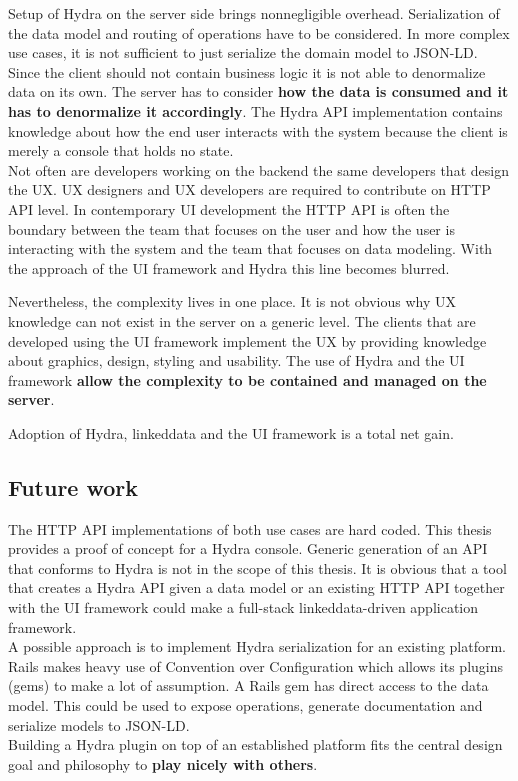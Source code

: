 Setup of Hydra on the server side brings nonnegligible overhead. Serialization of the data model and routing of operations have to be considered. In more complex use cases, it is not sufficient to just serialize the domain model to JSON-LD. Since the client should not contain business logic it is not able to denormalize data on its own. The server has to consider \textbf{how the data is consumed and it has to denormalize it accordingly}. The Hydra API implementation contains knowledge about how the end user interacts with the system because the client is merely a \gls{console} that holds no state. \\
Not often are developers working on the \gls{backend} the same developers that design the UX. UX designers and UX developers are required to contribute on HTTP API level. In contemporary UI development the HTTP API is often the boundary between the team that focuses on the user and how the user is interacting with the system and the team that focuses on data modeling. With the approach of the UI framework and Hydra this line becomes blurred.

Nevertheless, the complexity lives in one place. It is not obvious why UX knowledge can not exist in the server on a generic level. The clients that are developed using the UI framework implement the UX by providing knowledge about graphics, design, styling and usability. The use of Hydra and the UI framework \textbf{allow the complexity to be contained and managed on the server}.

Adoption of Hydra, \gls{linkeddata} and the UI framework is a total net gain.

\subsection{Future work}
The HTTP API implementations of both use cases are hard coded. This thesis provides a proof of concept for a Hydra \gls{console}. Generic generation of an API that conforms to Hydra is not in the scope of this thesis. It is obvious that a tool that creates a Hydra API given a data model or an existing HTTP API together with the UI framework could make a full-stack \gls{linkeddata}-driven application framework. \\
A possible approach is to implement Hydra serialization for an existing platform. Rails makes heavy use of Convention over Configuration which allows its plugins (gems) to make a lot of assumption. A Rails gem has direct access to the data model. This could be used to expose operations, generate documentation and serialize models to JSON-LD. \\
Building a Hydra plugin on top of an established platform fits the central design goal and philosophy to \textbf{play nicely with others}.
